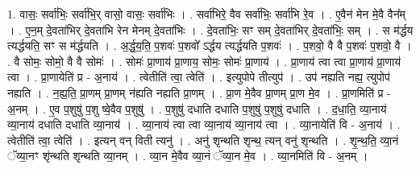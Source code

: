 \documentclass[17pt]{extarticle}
\begin{document}
1. वासः॒ सर्वा॑भिः॒ सर्वा॑भि॒र् वासो॒ वासः॒ सर्वा॑भिः । . सर्वा॑भिरे॒ वैव सर्वा॑भिः॒ सर्वा॑भि रे॒व । . ए॒वैन॑ मेन मे॒वै वैन᳚म् । . ए॒न॒म् दे॒वता॑भिर् दे॒वता॑भि रेन मेनम् दे॒वता॑भिः । . दे॒वता॑भिः॒ सꣳ सम् दे॒वता॑भिर् दे॒वता॑भिः॒ सम् । . स म॑र्द्धय त्यर्द्धयति॒ सꣳ स म॑र्द्धयति । . अ॒र्द्ध॒य॒ति॒ प॒शवः॑ प॒शवो᳚ ऽर्द्धय त्यर्द्धयति प॒शवः॑ । . प॒शवो॒ वै वै प॒शवः॑ प॒शवो॒ वै । . वै सोमः॒ सोमो॒ वै वै सोमः॑ । . सोमः॑ प्रा॒णाय॑ प्रा॒णाय॒ सोमः॒ सोमः॑ प्रा॒णाय॑ । . प्रा॒णाय॑ त्वा त्वा प्रा॒णाय॑ प्रा॒णाय॑ त्वा । . प्रा॒णायेति॑ प्र - अ॒नाय॑ । . त्वेतीति॑ त्वा॒ त्वेति॑ । . इत्युपोपे तीत्युप॑ । . उप॑ नह्यति नह्य॒ त्युपोप॑ नह्यति । . न॒ह्य॒ति॒ प्रा॒णम् प्रा॒णम् न॑ह्यति नह्यति प्रा॒णम् । . प्रा॒ण मे॒वैव प्रा॒णम् प्रा॒ण मे॒व । . प्रा॒णमिति॑ प्र - अ॒नम् । . ए॒व प॒शुषु॑ प॒शु ष्वे॒वैव प॒शुषु॑ । . प॒शुषु॑ दधाति दधाति प॒शुषु॑ प॒शुषु॑ दधाति । . द॒धा॒ति॒ व्या॒नाय॑ व्या॒नाय॑ दधाति दधाति व्या॒नाय॑ । . व्या॒नाय॑ त्वा त्वा व्या॒नाय॑ व्या॒नाय॑ त्वा । . व्या॒नायेति॑ वि - अ॒नाय॑ । . त्वेतीति॑ त्वा॒ त्वेति॑ । . इत्यन् वन् विती त्यनु॑ । . अनु॑ शृन्थति शृन्थ॒ त्यन् वनु॑ शृन्थति । . शृ॒न्थ॒ति॒ व्या॒नं ॅव्या॒नꣳ शृ॑न्थति शृन्थति व्या॒नम् । . व्या॒न मे॒वैव व्या॒नं ॅव्या॒न मे॒व । . व्या॒नमिति॑ वि - अ॒नम् । \newline
\end{document}
